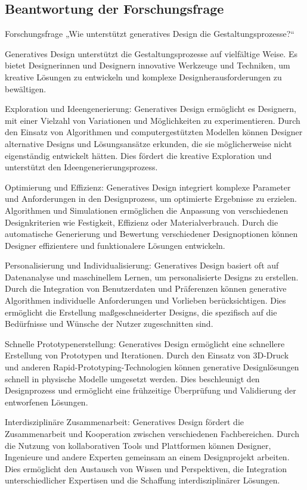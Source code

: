 \subsection*{Beantwortung der Forschungsfrage}

Forschungsfrage „Wie unterstützt generatives Design die Gestaltungsprozesse?“ 

Generatives Design unterstützt die Gestaltungsprozesse auf vielfältige Weise. Es bietet Designerinnen und Designern innovative Werkzeuge und Techniken, um kreative Lösungen zu entwickeln und komplexe Designherausforderungen zu bewältigen.

Exploration und Ideengenerierung: Generatives Design ermöglicht es Designern, mit einer Vielzahl von Variationen und Möglichkeiten zu experimentieren. Durch den Einsatz von Algorithmen und computergestützten Modellen können Designer alternative Designs und Lösungsansätze erkunden, die sie möglicherweise nicht eigenständig entwickelt hätten. Dies fördert die kreative Exploration und unterstützt den Ideengenerierungsprozess.

Optimierung und Effizienz: Generatives Design integriert komplexe Parameter und Anforderungen in den Designprozess, um optimierte Ergebnisse zu erzielen. Algorithmen und Simulationen ermöglichen die Anpassung von verschiedenen Designkriterien wie Festigkeit, Effizienz oder Materialverbrauch. Durch die automatische Generierung und Bewertung verschiedener Designoptionen können Designer effizientere und funktionalere Lösungen entwickeln.

Personalisierung und Individualisierung: Generatives Design basiert oft auf Datenanalyse und maschinellem Lernen, um personalisierte Designs zu erstellen. Durch die Integration von Benutzerdaten und Präferenzen können generative Algorithmen individuelle Anforderungen und Vorlieben berücksichtigen. Dies ermöglicht die Erstellung maßgeschneiderter Designs, die spezifisch auf die Bedürfnisse und Wünsche der Nutzer zugeschnitten sind.

Schnelle Prototypenerstellung: Generatives Design ermöglicht eine schnellere Erstellung von Prototypen und Iterationen. Durch den Einsatz von 3D-Druck und anderen Rapid-Prototyping-Technologien können generative Designlösungen schnell in physische Modelle umgesetzt werden. Dies beschleunigt den Designprozess und ermöglicht eine frühzeitige Überprüfung und Validierung der entworfenen Lösungen.

Interdisziplinäre Zusammenarbeit: Generatives Design fördert die Zusammenarbeit und Kooperation zwischen verschiedenen Fachbereichen. Durch die Nutzung von kollaborativen Tools und Plattformen können Designer, Ingenieure und andere Experten gemeinsam an einem Designprojekt arbeiten. Dies ermöglicht den Austausch von Wissen und Perspektiven, die Integration unterschiedlicher Expertisen und die Schaffung interdisziplinärer Lösungen.

